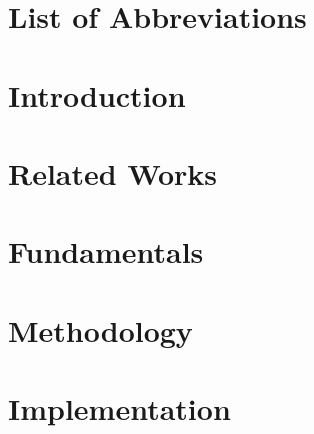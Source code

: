 \documentclass[fleqn]{report}
\author[1]{Giriraj Sukumar Pawar}
\begin{document}




\newpage


\newpage

\tableofcontents
\newpage

\listoffigures
\newpage

\listoftables
\newpage

\listofalgorithms
\newpage

\chapter*{List of Abbreviations}

\newpage

%

\chapter{Introduction}
    \label{introduction}
    
\newpage

\chapter{Related Works}
    \label{relatedworks}
    
\newpage    


\chapter{Fundamentals}
    \label{fundamentals}
    
\newpage

\chapter{Methodology}
    \label{methodology}
    
\newpage

\chapter{Implementation}
    \label{implementation}
    
\newpage
\end{document}
